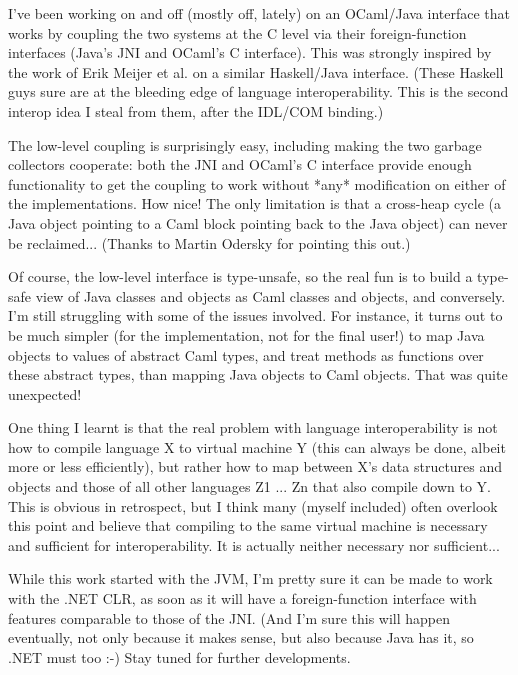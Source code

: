 \documentclass[acmsmall,review]{acmart}\settopmatter{printfolios=true,printccs=false,printacmref=false}
\begin{document}
\begin{verbquote}
I've been working on and off (mostly off, lately) on an OCaml/Java interface that works by coupling the two systems at the C level via their foreign-function interfaces (Java's JNI and OCaml's C interface).  This was strongly inspired by the work of Erik Meijer et al. on a similar Haskell/Java interface.  (These Haskell guys sure are at the bleeding edge of language interoperability.  This is the second interop idea I steal from them, after the IDL/COM binding.)

The low-level coupling is surprisingly easy, including making the two garbage collectors cooperate: both the JNI and OCaml's C interface provide enough functionality to get the coupling to work without *any* modification on either of the implementations.  How nice! The only limitation is that a cross-heap cycle (a Java object pointing to a Caml block pointing back to the Java object) can never be reclaimed... (Thanks to Martin Odersky for pointing this out.)

Of course, the low-level interface is type-unsafe, so the real fun is to build a type-safe view of Java classes and objects as Caml classes and objects, and conversely.  I'm still struggling with some of the issues involved.  For instance, it turns out to be much simpler (for the implementation, not for the final user!) to map Java objects to values of abstract Caml types, and treat methods as functions over these abstract types, than mapping Java objects to Caml objects.  That was quite unexpected!

One thing I learnt is that the real problem with language interoperability is not how to compile language X to virtual machine Y (this can always be done, albeit more or less efficiently), but rather how to map between X's data structures and objects and those of all other languages Z1 ... Zn that also compile down to Y.  This is obvious in retrospect, but I think many (myself included) often overlook this point and believe that compiling to the same virtual machine is necessary and sufficient for interoperability.  It is actually neither necessary nor sufficient...

While this work started with the JVM, I'm pretty sure it can be made to work with the .NET CLR, as soon as it will have a foreign-function interface with features comparable to those of the JNI.  (And I'm sure this will happen eventually, not only because it makes sense, but also because Java has it, so .NET must too :-)
Stay tuned for further developments. 
\end{verbquote}
\end{document}
